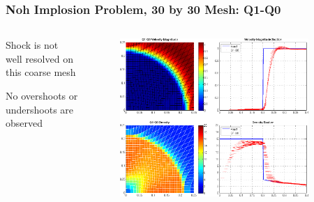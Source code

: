 \documentclass[8pt,xcolor=svgnames]{beamer}
\begin{document}
\begin{frame}
 \frametitle{Noh Implosion Problem, 30 by 30 Mesh: Q1-Q0}
 \begin{columns}[T]
  \begin{column}{0.24\textwidth}
  \bigskip
   \begin{itemize}
   \small{
    \item Shock is not well resolved on this coarse mesh
    \item No overshoots or undershoots are observed}
   \end{itemize}
  \end{column}
  \begin{column}{0.8\textwidth}
   \begin{figure}[h!]
    \centering
    \includegraphics[width=0.9\textwidth,keepaspectratio=true]{./Images/NewNoh_Q1Q0.png}
    \end{figure}
  \end{column}
 \end{columns}
\end{frame}
\end{document}
